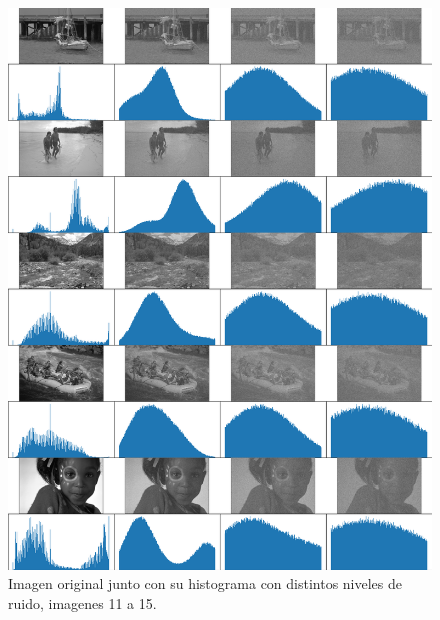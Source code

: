\begin{figure}
    \centering
    \includegraphics[width=\textwidth]{figuras/img_hist_noise_3.png}
    \caption{Imagen original junto con su histograma con distintos niveles de ruido, imagenes 11 a 15.}
\end{figure}



